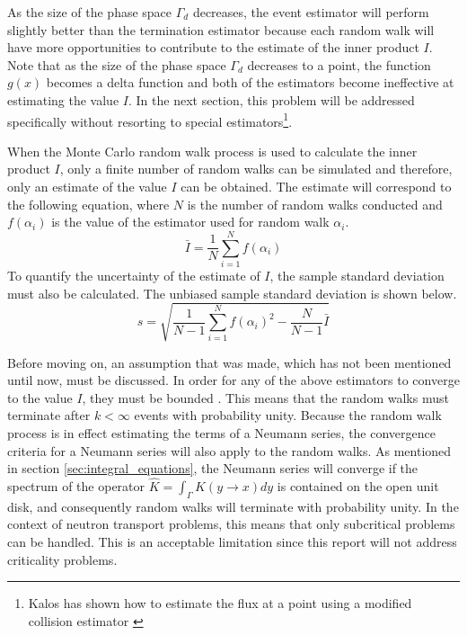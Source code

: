 As the size of the phase space $\Gamma_d$ decreases, the event estimator 
will perform slightly better than the termination estimator because each random
walk will have more opportunities to contribute to the estimate of the inner 
product $I$. Note that as the size of the phase space $\Gamma_d$ decreases to a 
point, the function $g(x)$ becomes a delta function and both of the estimators 
become ineffective at estimating the value $I$. In the next section, this 
problem will be addressed specifically without resorting to special estimators\footnote{Kalos has shown how to estimate the flux at a point using a modified
collision estimator \citep{kalos_estimation_1963}}.

When the Monte Carlo random walk process is used to calculate the inner product
$I$, only a finite number of random walks can be simulated and therefore, only 
an estimate of the value $I$ can be obtained. The estimate will
correspond to the following equation, where $N$ is the number of random walks
conducted and $f(\alpha_i)$ is the value of the estimator used for random
walk $\alpha_i$.
\begin{equation}
  \bar{I} = \frac{1}{N} \sum_{i=1}^N f(\alpha_i)
  \label{eq:inner_product_estimate}
\end{equation}
To quantify the uncertainty of the estimate of $I$, the sample standard 
deviation must also be calculated. The unbiased sample standard deviation is 
shown below.
\begin{equation}
  s = \sqrt{\frac{1}{N-1}\sum_{i=1}^N f(\alpha_i)^2 - \frac{N}{N-1}\bar{I}}
  \label{eq:inner_product_stddev}
\end{equation}

Before moving on, an assumption that was made, which has not been mentioned
until now, must be discussed. In order for any of the above estimators to 
converge to the value $I$, they must be bounded \citep{spanier_monte_1969}. This
means that the random walks must terminate after $k < \infty$ events with 
probability unity. Because the random walk process is in effect estimating the
terms of a Neumann series, the convergence criteria for a Neumann series will
also apply to the random walks. As mentioned in section 
\ref{sec:integral_equations}, the Neumann series will converge if the spectrum
of the operator $\hat{K} = \int_{\Gamma} K(y \to x)dy$ is contained on the open
unit disk, and consequently random walks will terminate with probability unity.
In the context of neutron transport problems, this means that only subcritical 
problems can be handled. This is an acceptable limitation since this report 
will not address criticality problems.

